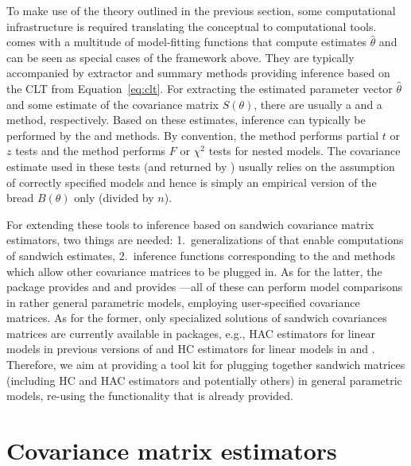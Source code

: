 \documentclass{Z}
\begin{document}
To make use of the theory outlined in the previous section, some computational infrastructure
is required translating the conceptual to computational tools.  comes with
a multitude of model-fitting functions that compute estimates $\hat \theta$ and can
be seen as special cases of the framework above. They are typically accompanied by extractor
and summary methods providing inference based on the CLT from Equation~\ref{eq:clt}. For extracting
the estimated parameter vector $\hat \theta$ and some estimate of the covariance matrix $S(\theta)$,
there are usually a  and a  method, respectively. Based on these estimates,
inference can typically be performed by the  and  methods.
By convention, the  method performs partial $t$ or $z$ tests and the
 method performs $F$ or $\chi^2$ tests for nested models. The covariance estimate
used in these tests (and returned by ) usually relies on the assumption of correctly
specified models and hence is simply an empirical version of the bread $B(\theta)$ only
(divided by $n$).

For extending these tools to inference based on sandwich covariance matrix estimators, two
things are needed: 1.~generalizations of  that enable computations of sandwich
estimates, 2.~inference functions corresponding to the  and 
methods which allow other covariance matrices to be plugged in. As for the latter, the package
 \citep{hac:Zeileis+Hothorn:2002} provides  and  and
 \citep{hac:Fox:2002} provides ---all of these can perform
model comparisons in rather general parametric models, employing user-specified covariance
matrices. As for the former, only specialized solutions of sandwich covariances matrices
are currently available in  packages, e.g., HAC estimators for linear models in
previous versions of  and HC estimators for linear models in  and
. Therefore, we aim at providing a tool kit
for plugging together sandwich matrices (including HC and HAC estimators and potentially others)
in general parametric models, re-using the functionality that is already provided.


\section{Covariance matrix estimators} \label{sec:vcov}
\end{document}
